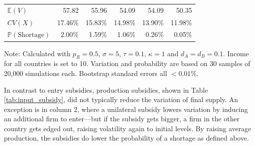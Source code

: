 \documentclass{article}
\begin{document}
\begin{table}
\begin{threeparttable}
\begin{tabular}{lrrrrr}
            $\mathbb{E}(V)$ & 57.82 & 55.96 & 54.09 & 54.09 & 50.35 \\
            $CV(X)$ & 17.46\% & 15.83\% & 14.98\% & 13.90\% & 11.98\% \\
            $\mathbb{P}(\text{Shortage})$ & 2.00\% & 1.59\% & 1.06\% & 0.26\% & 0.05\% \\ 
            \bottomrule
        \end{tabular}
        \begin{tablenotes}
            \small \item Note: Calculated with $p_R = 0.5$, $\sigma = 5$, $\tau = 0.1$, $\kappa = 1$ and $d_A = d_B = 0.1$. Income for all countries is set to 10. Variation and probability are based on 30 samples of 20,000 simulations each. Bootstrap standard errors all $<0.01\%$.
        \end{tablenotes}
    \end{threeparttable}
\end{table}

In contrast to entry subsidies, production subsidies, shown in Table \ref{tab:input_subsidy}, did not typically reduce the variation of final supply. An exception is in column 2, where a unilateral subsidy lowers variation by inducing an additional firm to enter---but if the subsidy gets bigger, a firm in the other country gets edged out, raising volatility again to initial levels. By raising average production, the subsidies do lower the probability of a shortage as defined above.
\end{document}
